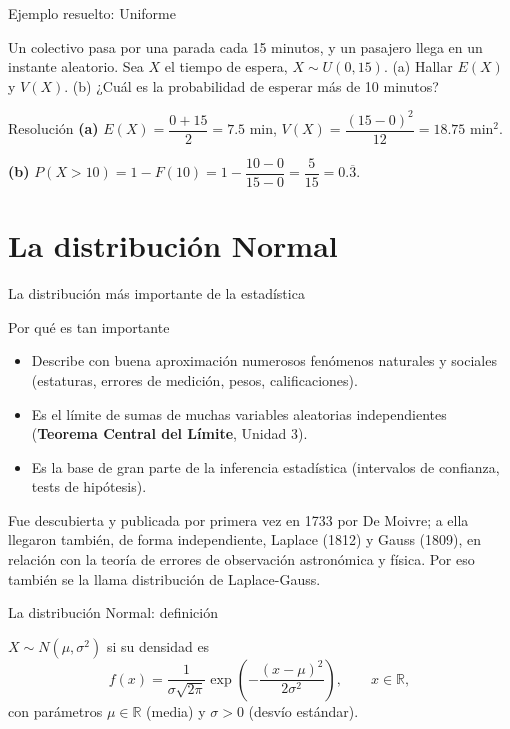 \documentclass[aspectratio=169,11pt]{beamer}
\begin{document}
\begin{frame}{Ejemplo resuelto: Uniforme}
\begin{example}
Un colectivo pasa por una parada cada 15 minutos, y un pasajero llega en un instante aleatorio. Sea $X$ el tiempo de espera, $X\sim U(0,15)$. (a) Hallar $E(X)$ y $V(X)$. (b) ¿Cuál es la probabilidad de esperar más de 10 minutos?
\end{example}

\begin{block}{Resolución}
\textbf{(a)} $E(X) = \dfrac{0+15}{2} = 7.5$ min, \quad $V(X) = \dfrac{(15-0)^2}{12} = 18.75$ min$^2$.

\textbf{(b)} $P(X>10) = 1-F(10) = 1-\dfrac{10-0}{15-0} = \dfrac{5}{15} = 0.\overline{3}$.
\end{block}
\end{frame}

\section{La distribución Normal}

\begin{frame}{La distribución más importante de la estadística}
\begin{block}{Por qué es tan importante}
\begin{itemize}
\item Describe con buena aproximación numerosos fenómenos naturales y sociales (estaturas, errores de medición, pesos, calificaciones).
\item Es el límite de sumas de muchas variables aleatorias independientes (\textbf{Teorema Central del Límite}, Unidad 3).
\item Es la base de gran parte de la inferencia estadística (intervalos de confianza, tests de hipótesis).
\end{itemize}
\end{block}

{\footnotesize Fue descubierta y publicada por primera vez en 1733 por De Moivre; a ella llegaron también, de forma independiente, Laplace (1812) y Gauss (1809), en relación con la teoría de errores de observación astronómica y física. Por eso también se la llama distribución de Laplace-Gauss.}
\end{frame}

\begin{frame}{La distribución Normal: definición}
\begin{definition}
$X\sim N(\mu,\sigma^2)$ si su densidad es
$$f(x) = \frac{1}{\sigma\sqrt{2\pi}}\exp\left(-\frac{(x-\mu)^2}{2\sigma^2}\right), \qquad x\in\mathbb{R},$$
con parámetros $\mu\in\mathbb{R}$ (media) y $\sigma>0$ (desvío estándar).
\end{definition}
\end{frame}
\end{document}
